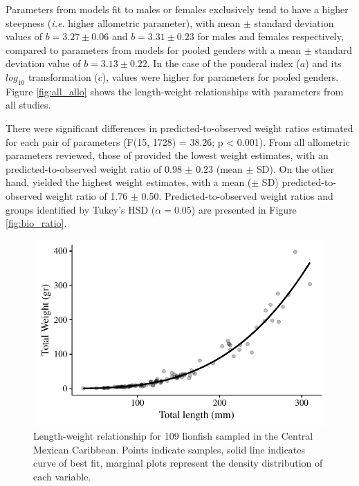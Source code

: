 \documentclass[fleqn,10pt,lineno]{wlpeerj} %
\theoremstyle{definition}
\theoremstyle{definition}
\theoremstyle{definition}
\theoremstyle{remark}
\begin{document}
Parameters from models fit to males or females exclusively tend to have
a higher steepness (\emph{i.e.} higher allometric parameter), with mean
\(\pm\) standard deviation values of \(b = 3.27 \pm 0.06\) and
\(b = 3.31 \pm 0.23\) for males and females respectively, compared to
parameters from models for pooled genders with a mean \(\pm\) standard
deviation value of \(b = 3.13 \pm 0.22\). In the case of the ponderal
index (\(a\)) and its \(log_{10}\) transformation (\(c\)), values were
higher for parameters for pooled genders. Figure \ref{fig:all_allo}
shows the length-weight relationships with parameters from all studies.

There were significant differences in predicted-to-observed weight
ratios estimated for each pair of parameters (F(15, 1728) = 38.26; p
\textless{} 0.001). From all allometric parameters reviewed, those of
\citet{edwards_2014} provided the lowest weight estimates, with an
predicted-to-observed weight ratio of 0.98 \(\pm\) 0.23 (mean \(\pm\)
SD). On the other hand,\citet{barbour_2011} yielded the highest weight
estimates, with a mean (\(\pm\) SD) predicted-to-observed weight ratio
of 1.76 \(\pm\) 0.50. Predicted-to-observed weight ratios and groups
identified by Tukey's HSD (\(\alpha = 0.05\)) are presented in Figure
\ref{fig:bio_ratio}.

\begin{figure}
\centering
\includegraphics{Manuscript_files/figure-latex/unnamed-chunk-3-1.pdf}
\caption{\label{fig:unnamed-chunk-3}\label{fig:l-w-carib}Length-weight
relationship for 109 lionfish sampled in the Central Mexican Caribbean.
Points indicate samples, solid line indicates curve of best fit,
marginal plots represent the density distribution of each variable.}
\end{figure}
\end{document}
